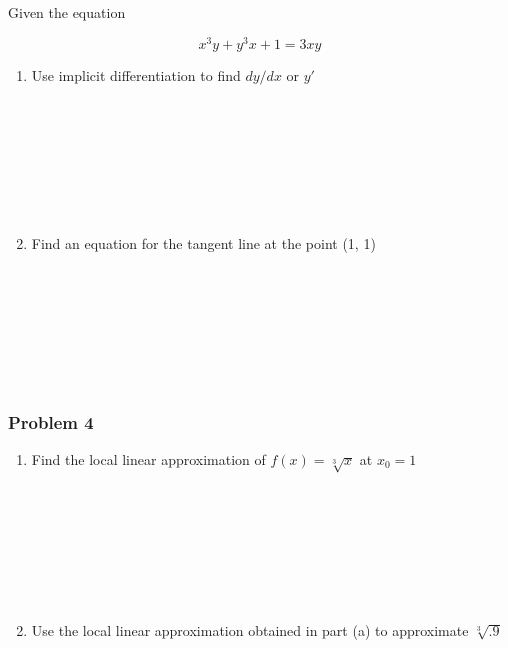 \documentclass[
  letterpaper,
  DIV=11,
  numbers=noendperiod]{scrartcl}
\begin{document}
Given the equation

\[
x^3y + y^3x + 1 = 3xy
\]

\begin{enumerate}
\def\labelenumi{\arabic{enumi}.}
\item
  Use implicit differentiation to find \(dy/dx\) or \(y'\)\\
  \strut \\
  \strut \\
  \strut \\
  \strut \\
\item
  Find an equation for the tangent line at the point (1, 1)\\
  \strut \\
  \strut \\
  \strut \\
  \strut \\
\end{enumerate}

\subsubsection{Problem 4}\label{problem-4}

\begin{enumerate}
\def\labelenumi{(\alph{enumi})}
\item
  Find the local linear approximation of \(f(x) = \sqrt[3]{x}\) at
  \(x_0 = 1\)\\
  \strut \\
  \strut \\
  \strut \\
  \strut \\
\item
  Use the local linear approximation obtained in part (a) to approximate
  \(\sqrt[3]{.9}\)
\end{enumerate}
\end{document}
